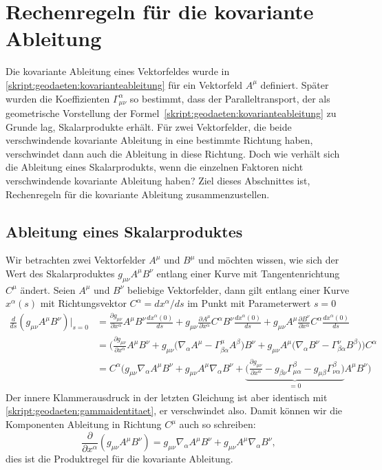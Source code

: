 %

\section{Rechenregeln für die kovariante Ableitung}
Die kovariante Ableitung eines Vektorfeldes wurde in 
\eqref{skript:geodaeten:kovarianteableitung}
für ein Vektorfeld $A^\mu$ definiert.
Später wurden die Koeffizienten $\Gamma^\alpha_{\mu\nu}$ so bestimmt,
dass der Paralleltransport, der als geometrische Vorstellung der
Formel~\eqref{skript:geodaeten:kovarianteableitung} zu Grunde lag,
Skalarprodukte erhält.
Für zwei Vektorfelder, die beide verschwindende
kovariante Ableitung in eine bestimmte Richtung haben,
verschwindet dann auch die Ableitung in diese Richtung.
Doch wie verhält sich die Ableitung eines Skalarprodukts, wenn
die einzelnen Faktoren nicht verschwindende kovariante Ableitung haben?
Ziel dieses Abschnittes ist, Rechenregeln für die kovariante Ableitung
zusammenzustellen.

\subsection{Ableitung eines Skalarproduktes}
Wir betrachten zwei Vektorfelder $A^\mu$ und $B^\mu$ und möchten wissen,
wie sich der Wert des Skalarproduktes $g_{\mu\nu}A^\mu B^\nu$ entlang
einer Kurve mit Tangentenrichtung $C^\mu$ ändert.
Seien $A^\mu$  und $B^\nu$ beliebige Vektorfelder,
dann gilt entlang einer Kurve $x^\alpha(s)$ mit
Richtungsvektor $C^\alpha = dx^\alpha/ds$ im Punkt mit Parameterwert $s=0$
\begin{align*}
\frac{d}{ds}(g_{\mu\nu}A^\mu B^\nu)\bigg|_{s=0}
&=
\frac{\partial g_{\mu\nu}}{\partial x^\alpha}A^\mu B^\nu
\frac{dx^\alpha(0)}{ds}
+
g_{\mu\nu}\frac{\partial A^\mu}{\partial x^\alpha}C^\alpha B^\nu
\frac{dx^\alpha(0)}{ds}
+
g_{\mu\nu}A^\mu \frac{\partial B^\nu}{\partial x^\alpha}C^\alpha
\frac{dx^\alpha(0)}{ds}
\\
&=
\biggl(
\frac{\partial g_{\mu\nu}}{\partial x^\alpha} A^\mu B^\nu
+
g_{\mu\nu}
\biggl(\nabla_\alpha A^\mu - \Gamma^\mu_{\beta\alpha}A^\beta \biggr)
B^\nu
+
g_{\mu\nu}A^\mu \biggl(\nabla_\alpha B^\nu-\Gamma^\nu_{\beta\alpha}B^\beta\biggr)
\biggr)C^\alpha
\\
&=
C^\alpha
\biggl(
g_{\mu\nu}\nabla_\alpha A^\mu B^\nu
+
g_{\mu\nu}A^\mu\nabla_\alpha B^\nu
+
\underbrace{
\biggl(
\frac{\partial g_{\mu\nu}}{\partial x^\alpha}
-g_{\beta\nu}\Gamma^\beta_{\mu\alpha}
-g_{\mu\beta}\Gamma^\beta_{\nu\alpha}
\biggr)}_{\displaystyle = 0}
A^\mu B^\nu
\biggr)
\end{align*}
Der innere Klammerausdruck in der letzten Gleichung ist aber identisch
mit \eqref{skript:geodaeten:gammaidentitaet}, er verschwindet also.
Damit können wir die Komponenten Ableitung in Richtung $C^\mu$ auch
so schreiben:
\[
\frac{\partial}{\partial x^\alpha}
(g_{\mu\nu}A^\mu B^\nu)
=
g_{\mu\nu}\nabla_\alpha A^\mu B^\nu
+
g_{\mu\nu}A^\mu\nabla_\alpha B^\nu,
\]
dies ist die Produktregel für die kovariante Ableitung.

